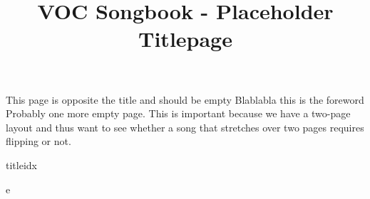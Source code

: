 \documentclass[twoside]{article}
\begin{document}
\title{VOC Songbook - Placeholder Titlepage}
\maketitle
\newpage
This page is opposite the title and should be empty
\newpage
Blablabla this is the foreword
\newpage
Probably one more empty page. This is important because we have a 
two-page layout and thus want to see whether a song that stretches over 
two pages requires flipping or not. 


\begin{songs}{titleidx}
























e









































\end{songs}
\end{document}
